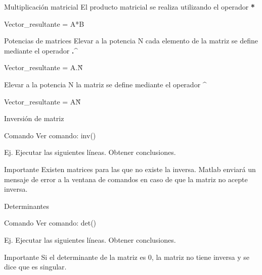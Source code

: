 \documentclass{bredelebeamer}
\begin{document}
\begin{frame}{Multiplicación matricial}
El producto matricial se realiza utilizando el operador \textbf{*}
\begin{center}
Vector\_resultante = A*B
\end{center}
\end{frame}

\begin{frame}{Potencias de matrices}
Elevar a la potencia N cada elemento de la matriz se define mediante el operador \textbf{.\^}
\begin{center}
Vector\_resultante = A.\^N
\end{center}
Elevar a la potencia N  la matriz se define mediante el operador \textbf{\^}
\begin{center}
Vector\_resultante = A\^N
\end{center}
\end{frame}

\begin{frame}{Inversión de matriz}
\begin{exampleblock}{Comando}
Ver comando: inv()
\end{exampleblock}
Ej. Ejecutar las siguientes líneas. Obtener conclusiones.
\begin{alertblock}{Importante}
Existen matrices para las que no existe la inversa. Matlab enviará un mensaje de error a la ventana de comandos en caso de que la matriz no acepte inversa.
\end{alertblock}
\end{frame}

\begin{frame}{Determinantes}
\begin{exampleblock}{Comando}
Ver comando: det()
\end{exampleblock}
Ej. Ejecutar las siguientes líneas. Obtener conclusiones.
\begin{alertblock}{Importante}
Si el determinante de la matriz es 0, la matriz no tiene inversa y se dice que es singular.
\end{alertblock}
\end{frame}
\end{document}
